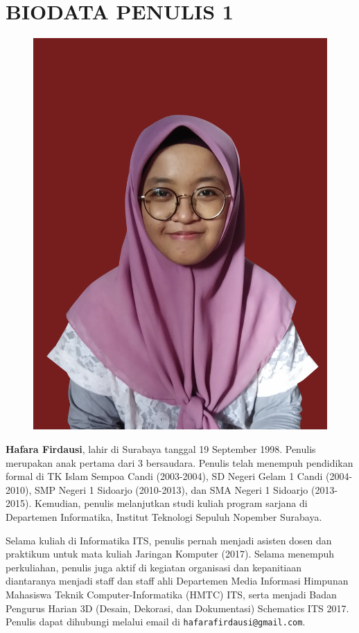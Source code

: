 \newpage
	\chapter{BIODATA PENULIS 1}
	\begin{figure}
	\includegraphics[height=0.3\textheight]{biodata/foto-hf.jpg}
	\end{figure}
	
	\textbf{Hafara Firdausi}, lahir di Surabaya tanggal 19 September 1998. Penulis merupakan anak pertama dari 3 bersaudara. Penulis telah menempuh pendidikan formal di TK Islam Sempoa Candi (2003-2004), SD Negeri Gelam 1 Candi (2004-2010), SMP Negeri 1 Sidoarjo (2010-2013), dan SMA Negeri 1 Sidoarjo (2013-2015). Kemudian, penulis melanjutkan studi kuliah program sarjana di Departemen Informatika, Institut Teknologi Sepuluh Nopember Surabaya. 
	
	Selama kuliah di Informatika ITS, penulis pernah menjadi asisten dosen dan praktikum untuk mata kuliah Jaringan Komputer (2017). Selama menempuh perkuliahan, penulis juga aktif di kegiatan organisasi dan kepanitiaan diantaranya menjadi staff dan staff ahli Departemen Media Informasi Himpunan Mahasiswa Teknik Computer-Informatika (HMTC) ITS, serta menjadi Badan Pengurus Harian 3D (Desain, Dekorasi, dan Dokumentasi) Schematics ITS 2017. Penulis dapat dihubungi melalui email di  \texttt{hafarafirdausi@gmail.com}.

